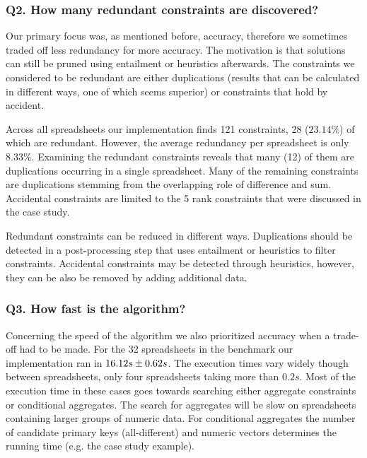 \documentclass{sig-alternate-05-2015}
\begin{document}
\subsubsection*{Q2. How many redundant constraints are discovered?}
Our primary focus was, as mentioned before, accuracy, therefore we sometimes traded off less redundancy for more accuracy.
The motivation is that solutions can still be pruned using entailment or heuristics afterwards.
The constraints we considered to be redundant are either duplications (results that can be calculated in different ways, one of which seems superior) or constraints that hold by accident.

Across all spreadsheets our implementation finds 121 constraints, 28 ($23.14\%$) of which are redundant.
However, the average redundancy per spreadsheet is only $8.33\%$.
Examining the redundant constraints reveals that many (12) of them are duplications occurring in a single spreadsheet.
Many of the remaining constraints are duplications stemming from the overlapping role of difference and sum.
Accidental constraints are limited to the 5 rank constraints that were discussed in the case study.

Redundant constraints can be reduced in different ways.
Duplications should be detected in a post-processing step that uses entailment or heuristics to filter constraints.
Accidental constraints may be detected through heuristics, however, they can be also be removed by adding additional data.

\subsubsection*{Q3. How fast is the algorithm?}
Concerning the speed of the algorithm we also prioritized accuracy when a trade-off had to be made.
For the 32 spreadsheets in the benchmark our implementation ran in ${16.12}s \pm {0.62}s$.
The execution times vary widely though between spreadsheets, only four spreadsheets taking more than $0.2s$.
Most of the execution time in these cases goes towards searching either aggregate constraints or conditional aggregates.
The search for aggregates will be slow on spreadsheets containing larger groups of numeric data.
For conditional aggregates the number of candidate primary keys (all-different) and numeric vectors determines the running time (e.g. the case study example).
\end{document}
